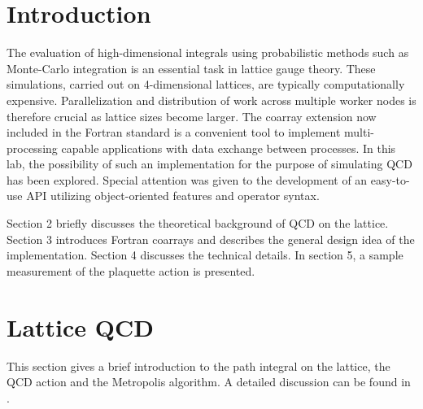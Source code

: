 \documentclass[graybox]{svmult}
\begin{document}
%
%
\maketitle




\section{Introduction} \label{sect:introduction}
The evaluation of high-dimensional integrals using probabilistic methods such as Monte-Carlo integration is an essential task in lattice gauge theory. These simulations, carried out on 4-dimensional lattices, are typically computationally expensive. Parallelization and distribution of work across multiple worker nodes is therefore crucial as lattice sizes become larger. The coarray extension now included in the Fortran standard is a convenient tool to implement multi-processing capable applications with data exchange between processes. In this lab, the possibility of such an implementation for the purpose of simulating QCD has been explored. Special attention was given to the development of an easy-to-use API utilizing object-oriented features and operator syntax.

Section 2 briefly discusses the theoretical background of QCD on the lattice. Section 3 introduces Fortran coarrays and describes the general design idea of the implementation. Section 4 discusses the technical details. In section 5, a sample measurement of the plaquette action is presented.

\section{Lattice QCD}

This section gives a brief introduction to the path integral on the lattice, the QCD action and the Metropolis algorithm. A detailed discussion can be found in \cite{gattringer}.
\end{document}
